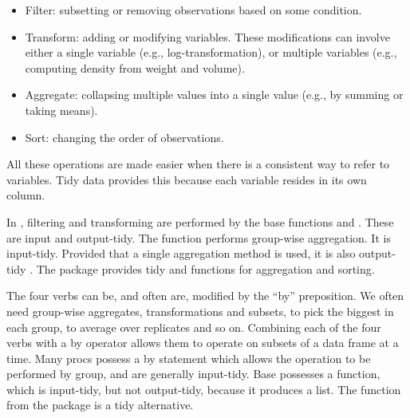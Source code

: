 \documentclass[article]{jss}
\begin{document}
\begin{itemize}

  \item Filter: subsetting or removing observations based on some
  condition.

  \item Transform: adding or modifying variables. These modifications can
  involve either a single variable (e.g., log-transformation), or multiple 
  variables (e.g., computing density from weight and volume).

  \item Aggregate: collapsing multiple values into a single value (e.g., by 
  summing or taking means).

  \item Sort: changing the order of observations.

\end{itemize}

All these operations are made easier when there is a consistent way to refer to variables. Tidy data provides this because each variable resides in its own column.

In , filtering and transforming are performed by the base  functions  and . These are input and output-tidy. The  function performs group-wise aggregation. It is input-tidy. Provided that a single aggregation method is used, it is also output-tidy . The  package provides tidy  and  functions for aggregation and sorting.

The four verbs can be, and often are, modified by the ``by'' preposition. We often need group-wise aggregates, transformations and subsets, to pick the biggest in each group, to average over replicates and so on. Combining each of the four verbs with a by operator allows them to operate on subsets of a data frame at a time. Many  {\sc proc}s possess a {\sc by} statement which allows the operation to be performed by group, and are generally input-tidy. Base  possesses a  function, which is input-tidy, but not output-tidy, because it produces a list. The  function from the  package is a tidy alternative.

\end{document}
